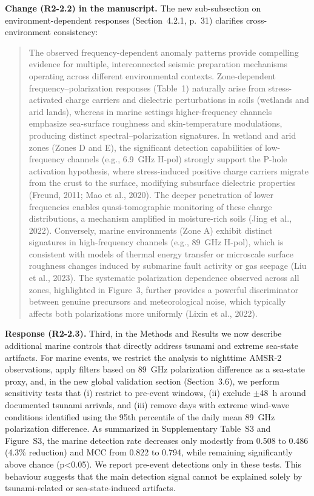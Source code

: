 \documentclass[12pt]{article}
\newcommand{\revresponse}[1]{\begingroup\color{responsecolor}#1\endgroup}
\newcommand{\revchange}[1]{\begingroup\color{changecolor}#1\endgroup}
\begin{document}
\revchange{%
\textbf{Change (R2-2.2) in the manuscript.}
The new sub-subsection on environment-dependent responses (Section~4.2.1, p.~31) clarifies cross-environment consistency:

\begin{quote}
The observed frequency-dependent anomaly patterns provide compelling evidence for multiple, interconnected seismic preparation mechanisms operating across different environmental contexts. Zone-dependent frequency--polarization responses (Table~1) naturally arise from stress-activated charge carriers and dielectric perturbations in soils (wetlands and arid lands), whereas in marine settings higher-frequency channels emphasize sea-surface roughness and skin-temperature modulations, producing distinct spectral--polarization signatures. In wetland and arid zones (Zones D and E), the significant detection capabilities of low-frequency channels (e.g., 6.9~GHz H-pol) strongly support the P-hole activation hypothesis, where stress-induced positive charge carriers migrate from the crust to the surface, modifying subsurface dielectric properties (Freund, 2011; Mao et al., 2020). The deeper penetration of lower frequencies enables quasi-tomographic monitoring of these charge distributions, a mechanism amplified in moisture-rich soils (Jing et al., 2022). Conversely, marine environments (Zone A) exhibit distinct signatures in high-frequency channels (e.g., 89~GHz H-pol), which is consistent with models of thermal energy transfer or microscale surface roughness changes induced by submarine fault activity or gas seepage (Liu et al., 2023). The systematic polarization dependence observed across all zones, highlighted in Figure~3, further provides a powerful discriminator between genuine precursors and meteorological noise, which typically affects both polarizations more uniformly (Lixin et al., 2022).
\end{quote}
}

\revresponse{%
\textbf{Response (R2-2.3).} Third, in the Methods and Results we now describe additional marine controls that directly address tsunami and extreme sea-state artifacts. For marine events, we restrict the analysis to nighttime AMSR-2 observations, apply filters based on 89~GHz polarization difference as a sea-state proxy, and, in the new global validation section (Section~3.6), we perform sensitivity tests that (i) restrict to pre-event windows, (ii) exclude $\pm$48~h around documented tsunami arrivals, and (iii) remove days with extreme wind-wave conditions identified using the 95th percentile of the daily mean 89~GHz polarization difference. As summarized in Supplementary Table~S3 and Figure~S3, the marine detection rate decreases only modestly from 0.508 to 0.486 (4.3\% reduction) and MCC from 0.822 to 0.794, while remaining significantly above chance (p<0.05). We report pre-event detections only in these tests. This behaviour suggests that the main detection signal cannot be explained solely by tsunami-related or sea-state-induced artifacts.
}
\end{document}
